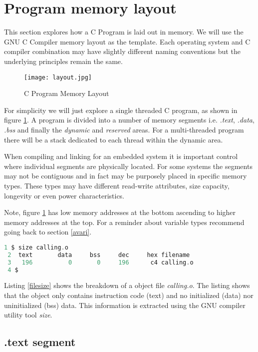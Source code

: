 \section{Program memory layout} \label{Memory Layout}

This section explores how a C Program is laid out in memory. We will use the GNU C Compiler memory layout as the template. Each operating system and C compiler combination may have slightly different naming conventions but the underlying principles remain the same.
 \begin{figure}[H]
\centerline{\texttt{[image: layout.jpg]}}
\caption{C Program Memory Layout}
\label{CProgMem}
\end{figure}

For simplicity we will just explore a single threaded C program, as shown in figure \ref{CProgMem}. A program is divided into a number of memory segments i.e. \textit{.text}, \textit{.data}, \textit{.bss} and finally the \textit{dynamic} and \textit{reserved} areas. For a multi-threaded program there will be a stack dedicated to each thread within the dynamic area. 

When compiling and linking for an embedded system it is important control where individual segments are physically located. For some systems the segments may not be contiguous and in fact may be purposely placed in specific memory types. These types may have different read-write attributes, size capacity, longevity or even power characteristics.    

Note, figure \ref{CProgMem} has low memory addresses at the bottom ascending to higher memory addresses at the top. For a reminder about variable types recommend going back to section \ref{avari}.

\newpage

\begin{lstlisting}[language=C,showstringspaces=false,caption={Image segment breakdown},captionpos=b,label=filesize]
 1 $ size calling.o
 2  text	   data	    bss	    dec	    hex	filename
 3   196	      0	      0	    196	     c4	calling.o
 4 $ 
\end{lstlisting}

Listing \ref{filesize} shows the breakdown of a object file \textit{calling.o}. The listing shows that the object only contains instruction code (text) and no initialized (data) nor uninitialized (bss) data. This information is extracted using the GNU compiler utility tool \textit{size}. 

\subsection{.text segment} 

